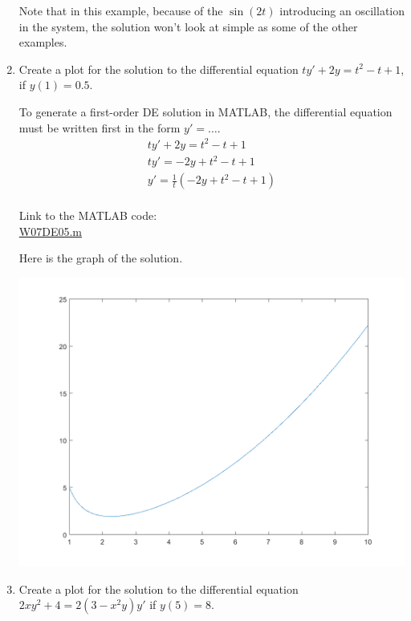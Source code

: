 \begin{enumerate}
\begin{Solution}
Note that in this example, because of the $\sin(2t)$ introducing an
oscillation in the system, the solution won't look at simple as some
of the other examples.
\end{Solution}

\item
\begin{Question}
  Create a plot for the solution to the differential equation
  $ty' + 2y = t^2 - t + 1$, if $y(1) = 0.5$.
    
\end{Question}

\begin{Solution}
  To generate a first-order DE solution in MATLAB, the differential
  equation must be written first in the form $y' = \ldots$.
  \begin{align*}
    ty' + 2y = t^2 - t + 1 \\
    ty' = -2y + t^2 - t + 1 \\
    y' = \frac{1}{t} (-2y + t^2 - t + 1) \\
  \end{align*}
    
Link to the MATLAB code: \\
\href{http://www.mast.queensu.ca/~apsc171/MNTCP01/PracticeProblems/MATLAB/W07DE05.m}{W07DE05.m}

Here is the graph of the solution.

\includegraphics[width = 0.5\linewidth]{graphics/Week07_DESolutions/W07DE05}
    
    
\end{Solution}

\item
\begin{Question}
  Create a plot for the solution to the differential equation
  $2xy^2 + 4 = 2(3 - x^2y)y'$ if $y(5) = 8$.
    
\end{Question}


\end{enumerate}
